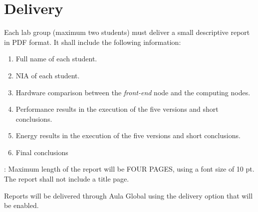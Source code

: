 \section{Delivery}

Each lab group (maximum two students) must deliver a small descriptive report
in PDF format. It shall include the following information:

\begin{enumerate}
  \item Full name of each student.
  \item NIA of each student.
  \item Hardware comparison between the \emph{front-end} node and the computing nodes.
  \item Performance results in the execution of the five versions and short conclusions.
  \item Energy results in the execution of the five versions and short conclusions.
  \item Final conclusions
\end{enumerate}

: 
    Maximum length of the report will be FOUR PAGES, using a font size of 10 pt.
    The report shall not include a title page.

Reports will be delivered through Aula Global using the delivery option that will be
enabled.
